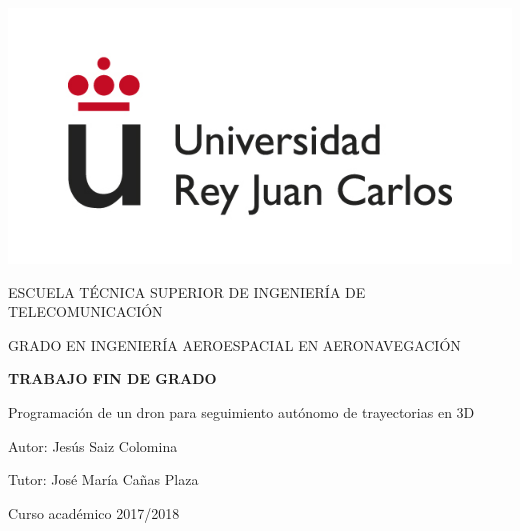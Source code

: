 \documentclass[a4paper, 12pt, oneside]{book}
\begin{document}
\begin{titlepage}
	\begin{center}
		\vspace*{1mm}
		\begin{center}
			\includegraphics[width=0.8\linewidth]{imag/logo.jpg}
		\end{center}
		\vspace{6.5mm}
		
		\fontsize{15.5}{14}\selectfont ESCUELA TÉCNICA SUPERIOR DE INGENIERÍA DE TELECOMUNICACIÓN
		\vspace{8mm}
		
		\fontsize{14}{14}\selectfont GRADO EN INGENIERÍA AEROESPACIAL EN AERONAVEGACIÓN
		
		\vspace{60pt}
		
		\fontsize{15.7}{14}\selectfont \textbf{TRABAJO FIN DE GRADO} 
		
		\vspace{15mm}
		\begin{huge}
			Programación de un dron para seguimiento autónomo de trayectorias en 3D 
		\end{huge}
		
		\vspace{15mm}
		
		\begin{large}
			Autor: Jesús Saiz Colomina
			
			Tutor: José María Cañas Plaza
			
			\vspace{7mm}
		\end{large}
		\begin{normalsize}
			Curso académico 2017/2018		
		\end{normalsize}
	\end{center}
\end{titlepage}

\thispagestyle{empty}
\afterpage{\null\newpage}
\newpage
\end{document}
